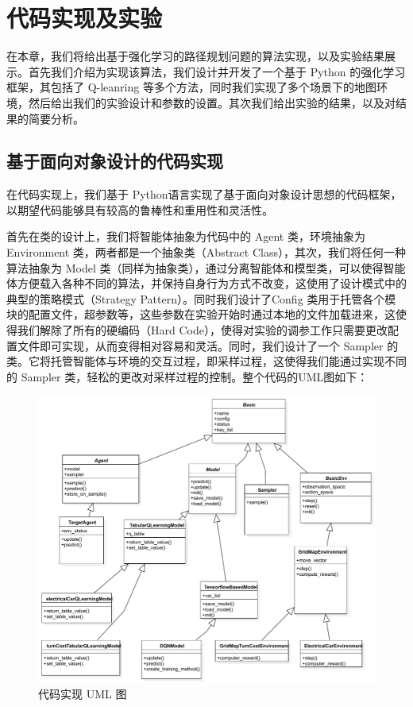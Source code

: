 \documentclass{standalone}
\begin{document}
	
\chapter{代码实现及实验}
在本章，我们将给出基于强化学习的路径规划问题的算法实现，以及实验结果展示。首先我们介绍为实现该算法，我们设计并开发了一个基于 Python 的强化学习框架，其包括了 Q-leanring 等多个方法，同时我们实现了多个场景下的地图环境，然后给出我们的实验设计和参数的设置。其次我们给出实验的结果，以及对结果的简要分析。
\section{基于面向对象设计的代码实现}
在代码实现上，我们基于 Python语言实现了基于面向对象设计思想的代码框架，以期望代码能够具有较高的鲁棒性和重用性和灵活性。\par
首先在类的设计上，我们将智能体抽象为代码中的 Agent 类，环境抽象为Environment 类，两者都是一个抽象类（Abstract Class），其次，我们将任何一种算法抽象为 Model 类（同样为抽象类），通过分离智能体和模型类，可以使得智能体方便载入各种不同的算法，并保持自身行为方式不改变，这使用了设计模式中的典型的策略模式（Strategy Pattern）。同时我们设计了Config 类用于托管各个模块的配置文件，超参数等，这些参数在实验开始时通过本地的文件加载进来，这使得我们解除了所有的硬编码（Hard Code），使得对实验的调参工作只需要更改配置文件即可实现，从而变得相对容易和灵活。同时，我们设计了一个 Sampler 的类。它将托管智能体与环境的交互过程，即采样过程，这使得我们能通过实现不同的 Sampler 类，轻松的更改对采样过程的控制。整个代码的UML图如下：
\begin{figure}
	\includegraphics[width=12.0cm]{pic/6-1.pdf}
	\caption{代码实现 UML 图}
	\label{6-1}
\end{figure}
\end{document}
